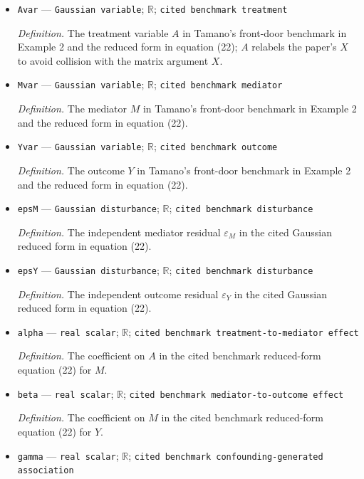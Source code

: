 \documentclass{article}
\begin{document}
\begin{itemize}
  \item \texttt{Avar} --- \texttt{Gaussian variable}; \(\mathbb R\); \texttt{cited benchmark treatment}
  \par\smallskip\noindent\emph{Definition.} The treatment variable \(A\) in Tamano's front-door benchmark in Example 2 and the reduced form in equation (22); \(A\) relabels the paper's \(X\) to avoid collision with the matrix argument \(X\).
  \item \texttt{Mvar} --- \texttt{Gaussian variable}; \(\mathbb R\); \texttt{cited benchmark mediator}
  \par\smallskip\noindent\emph{Definition.} The mediator \(M\) in Tamano's front-door benchmark in Example 2 and the reduced form in equation (22).
  \item \texttt{Yvar} --- \texttt{Gaussian variable}; \(\mathbb R\); \texttt{cited benchmark outcome}
  \par\smallskip\noindent\emph{Definition.} The outcome \(Y\) in Tamano's front-door benchmark in Example 2 and the reduced form in equation (22).
  \item \texttt{epsM} --- \texttt{Gaussian disturbance}; \(\mathbb R\); \texttt{cited benchmark disturbance}
  \par\smallskip\noindent\emph{Definition.} The independent mediator residual \(\varepsilon_M\) in the cited Gaussian reduced form in equation (22).
  \item \texttt{epsY} --- \texttt{Gaussian disturbance}; \(\mathbb R\); \texttt{cited benchmark disturbance}
  \par\smallskip\noindent\emph{Definition.} The independent outcome residual \(\varepsilon_Y\) in the cited Gaussian reduced form in equation (22).
  \item \texttt{alpha} --- \texttt{real scalar}; \(\mathbb R\); \texttt{cited benchmark treatment-\allowbreak{}to-\allowbreak{}mediator effect}
  \par\smallskip\noindent\emph{Definition.} The coefficient on \(A\) in the cited benchmark reduced-form equation (22) for \(M\).
  \item \texttt{beta} --- \texttt{real scalar}; \(\mathbb R\); \texttt{cited benchmark mediator-\allowbreak{}to-\allowbreak{}outcome effect}
  \par\smallskip\noindent\emph{Definition.} The coefficient on \(M\) in the cited benchmark reduced-form equation (22) for \(Y\).
  \item \texttt{gamma} --- \texttt{real scalar}; \(\mathbb R\); \texttt{cited benchmark confounding-\allowbreak{}generated association}

\end{itemize}
\end{document}

